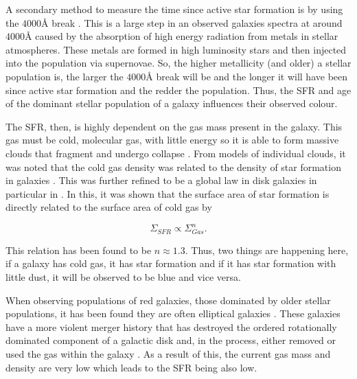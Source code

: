 A secondary method to measure the time since active star formation is by using the $4000\textrm{\AA}$ break \citep{1998ApJ...504L..75B}. This is a large step in an observed galaxies spectra at around $4000\textrm{\AA}$ caused by the absorption of high energy radiation from metals in stellar atmospheres. These metals are formed in high luminosity stars and then injected into the population via supernovae. So, the higher metallicity (and older) a stellar population is, the larger the $4000\textrm{\AA}$ break will be and the longer it will have been since active star formation and the redder the population. Thus, the SFR and age of the dominant stellar population of a galaxy influences their observed colour.

The SFR, then, is highly dependent on the gas mass present in the galaxy. This gas must be cold, molecular gas, with little energy so it is able to form massive clouds that fragment and undergo collapse \citep{1965MNRAS.130...97G, 1972ApJ...176L...9Q}. From models of individual clouds, it was noted that the cold gas density was related to the density of star formation in galaxies \citep{1959ApJ...129..243S}. This was further refined to be a global law in disk galaxies in particular in \citet{1998ApJ...498..541K}. In this, it was shown that the surface area of star formation is directly related to the surface area of cold gas by 

\begin{equation}\label{eq:ks-law}
\Sigma_{SFR} \propto \Sigma_{Gas}^{n}. 
\end{equation}

\noindent This relation has been found to be $n\approx1.3$. Thus, two things are happening here, if a galaxy has cold gas, it has star formation and if it has star formation with little dust, it will be observed to be blue and vice versa.

When observing populations of red galaxies, those dominated by older stellar populations, it has been found they are often elliptical galaxies \citep{1992MNRAS.254..589B}. These galaxies have a more violent merger history that has destroyed the ordered rotationally dominated component of a galactic disk and, in the process, either removed or used the gas within the galaxy \citep{1976ApJ...204..365F}. As a result of this, the current gas mass and density are very low which leads to the SFR being also low.

